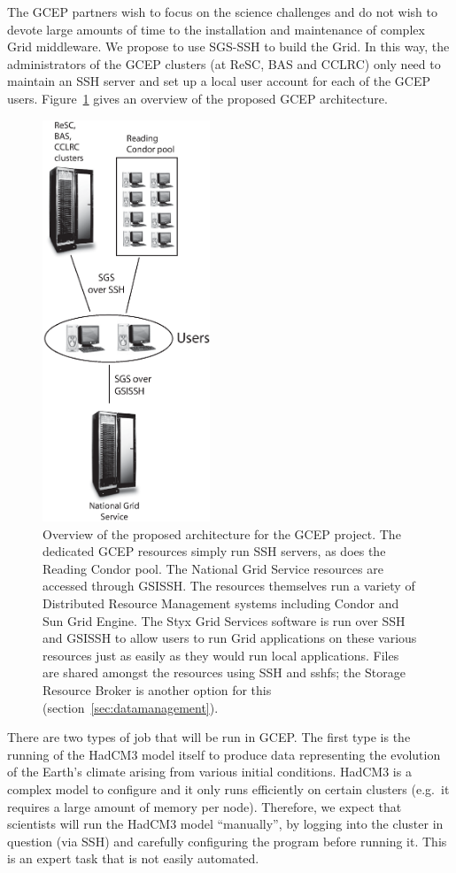 \documentclass[times,10pt,twocolumn,8.5x11]{article}
\begin{document}

The GCEP partners wish to focus on the science challenges and do not wish to devote large amounts of time to the installation and maintenance of complex Grid middleware.  We propose to use SGS-SSH to build the Grid.  In this way, the administrators of the GCEP clusters (at ReSC, BAS and CCLRC) only need to maintain an SSH server and set up a local user account for each of the GCEP users.  Figure~\ref{fig:gcep} gives an overview of the proposed GCEP architecture.

\begin{figure}
\centering
\includegraphics[height=12cm]{GCEP_architecture.eps}
\caption{Overview of the proposed architecture for the GCEP project. The dedicated GCEP resources simply run SSH servers, as does the Reading Condor pool.  The National Grid Service resources are accessed through GSISSH.  The resources themselves run a variety of Distributed Resource Management systems including Condor and Sun Grid Engine.  The Styx Grid Services software is run over SSH and GSISSH to allow users to run Grid applications on these various resources just as easily as they would run local applications.  Files are shared amongst the resources using SSH and sshfs; the Storage Resource Broker is another option for this (section~\ref{sec:datamanagement}).} 
\label{fig:gcep}
\end{figure}

There are two types of job that will be run in GCEP.  The first type is the running of the HadCM3 model itself to produce data representing the evolution of the Earth's climate arising from various initial conditions.  HadCM3 is a complex model to configure and it only runs efficiently on certain clusters (e.g.\ it requires a large amount of memory per node).  Therefore, we expect that scientists will run the HadCM3 model ``manually'', by logging into the cluster in question (via SSH) and carefully configuring the program before running it.  This is an expert task that is not easily automated.
\end{document}
